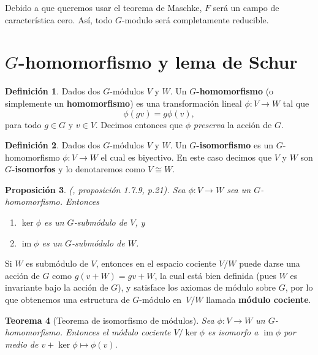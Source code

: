 \documentclass[12pt]{book}
\newtheorem{theorem}{Teorema}[section]
\newtheorem{proposition}[theorem]{Proposición}
\theoremstyle{definition}
\newtheorem{definition}[theorem]{Definición}
\DeclareMathOperator{\im}{im}
\newcounter{in}
\newcounter{ini}
\begin{document}
Debido a que queremos usar el teorema de Maschke, $F$ será un campo de
característica cero. Así, todo $G$-modulo será completamente
reducible.

\section{$G$-homomorfismo y lema de Schur} 
\label{schur}


\begin{definition}
  Dados dos $G$-módulos $V$ y $W$. Un $G$\textbf{-homomorfismo} (o simplemente
  un \textbf{homomorfismo}) es una transformación lineal $\phi:V\rightarrow
  W$ tal que
  \begin{equation*}
    \phi(gv)=g\phi(v),
  \end{equation*}
para todo $g\in G$ y $v\in V$. Decimos entonces que $\phi$ \emph{preserva} la acción
de $G$.
\end{definition}

\begin{definition}
  Dados dos $G$-módulos $V$ y $W$. Un $G$\textbf{-isomorfismo} es un
  $G$-homomorfismo $\phi:V\rightarrow W$ el cual es biyectivo. En
  este caso decimos que $V$ y $W$ son $G$\textbf{-isomorfos} y lo
  denotaremos como $V\cong W$.
\end{definition}

\begin{proposition}{\normalfont (\cite{sagan2001symmetric}, proposición 1.7.9, p.21)}.
  \label{ker-im-sub}
  Sea $\phi:V\rightarrow W$ sea un $G$-homomorfismo. Entonces
  \begin{enumerate}
  \item $\ker\phi$ es un $G$-submódulo de $V$, y
  \item $\im\phi$ es un $G$-submódulo de $W$.
  \end{enumerate}
\end{proposition}  
Si $W$ es submódulo de $V$, entonces en el espacio cociente
$V/W$ puede darse una acción de $G$ como $g(v+W)=gv+W$, la cual está
bien definida (pues $W$ es invariante bajo la acción de $G$), y
satisface los axiomas de módulo sobre $G$, por lo que obtenemos una
estructura de $G$-módulo en~$V/W$ llamada \textbf{módulo cociente}.

\begin{theorem}[Teorema de isomorfismo de módulos]
  \label{teorema-isomorfismo-mod}
  Sea $\phi:V\rightarrow W$ un $G$-homomorfismo. Entonces el
  módulo cociente $V/\ker\phi$ es isomorfo a $\im\phi$ por medio de
  $v+\ker\phi\mapsto\phi(v)$.
\end{theorem}
\end{document}
